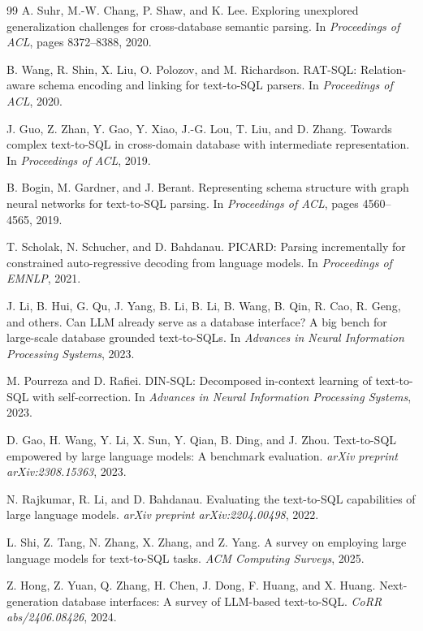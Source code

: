\documentclass[11pt]{article}
\begin{document}
\begin{thebibliography}{99}
A. Suhr, M.-W. Chang, P. Shaw, and K. Lee.
Exploring unexplored generalization challenges for cross-database semantic parsing.
In \emph{Proceedings of ACL}, pages 8372--8388, 2020.

B. Wang, R. Shin, X. Liu, O. Polozov, and M. Richardson.
RAT-SQL: Relation-aware schema encoding and linking for text-to-SQL parsers.
In \emph{Proceedings of ACL}, 2020.

J. Guo, Z. Zhan, Y. Gao, Y. Xiao, J.-G. Lou, T. Liu, and D. Zhang.
Towards complex text-to-SQL in cross-domain database with intermediate representation.
In \emph{Proceedings of ACL}, 2019.

B. Bogin, M. Gardner, and J. Berant.
Representing schema structure with graph neural networks for text-to-SQL parsing.
In \emph{Proceedings of ACL}, pages 4560--4565, 2019.

T. Scholak, N. Schucher, and D. Bahdanau.
PICARD: Parsing incrementally for constrained auto-regressive decoding from language models.
In \emph{Proceedings of EMNLP}, 2021.

J. Li, B. Hui, G. Qu, J. Yang, B. Li, B. Li, B. Wang, B. Qin, R. Cao, R. Geng, and others.
Can LLM already serve as a database interface? A big bench for large-scale database grounded text-to-SQLs.
In \emph{Advances in Neural Information Processing Systems}, 2023.

M. Pourreza and D. Rafiei.
DIN-SQL: Decomposed in-context learning of text-to-SQL with self-correction.
In \emph{Advances in Neural Information Processing Systems}, 2023.

D. Gao, H. Wang, Y. Li, X. Sun, Y. Qian, B. Ding, and J. Zhou.
Text-to-SQL empowered by large language models: A benchmark evaluation.
\emph{arXiv preprint arXiv:2308.15363}, 2023.

N. Rajkumar, R. Li, and D. Bahdanau.
Evaluating the text-to-SQL capabilities of large language models.
\emph{arXiv preprint arXiv:2204.00498}, 2022.

L. Shi, Z. Tang, N. Zhang, X. Zhang, and Z. Yang.
A survey on employing large language models for text-to-SQL tasks.
\emph{ACM Computing Surveys}, 2025.

Z. Hong, Z. Yuan, Q. Zhang, H. Chen, J. Dong, F. Huang, and X. Huang.
Next-generation database interfaces: A survey of LLM-based text-to-SQL.
\emph{CoRR abs/2406.08426}, 2024.


\end{thebibliography}
\end{document}
